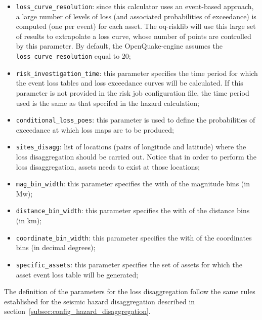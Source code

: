 \begin{itemize}
\item \Verb+loss_curve_resolution+: since this calculator uses an event\--based ap\-proach, a large number of levels of loss (and associated probabilities of exceedance) is computed (one per event) for each asset. The oq-risklib will use this large set of results to extrapolate a loss curve, whose number of points are controlled by this parameter. By default, the OpenQuake-engine assumes the \Verb+loss_curve_resolution+ equal to 20;
\item  \Verb+risk_investigation_time+: this parameter specifies the time period for which the event loss tables and loss exceedance curves will be calculated. If this parameter is not provided in the risk job configuration file, the time period used is the same as that specifed in the hazard calculation;
\item  \Verb+conditional_loss_poes+: this parameter is used to define the probabilities of exceedance at which loss maps are to be produced;
\item  \Verb+sites_disagg+: list of locations (pairs of longitude and latitude) where the loss disaggregation should be carried out. Notice that in order to perform the loss disaggregation, assets needs to exist at those locations;
\item  \Verb+mag_bin_width+: this parameter specifies the with of the magnitude bins (in Mw);
\item  \Verb+distance_bin_width+: this parameter specifies the with of the distance bins (in km);
\item  \Verb+coordinate_bin_width+: this parameter specifies the with of the coordinates bins (in decimal degrees);
\item  \Verb+specific_assets+: this parameter specifies the set of assets for which the asset event loss table will be generated;
\end{itemize}

The definition of the parameters for the loss disaggregation follow the same rules established for the seismic hazard disaggregation described in section~\ref{subsec:config_hazard_disaggregation}.

